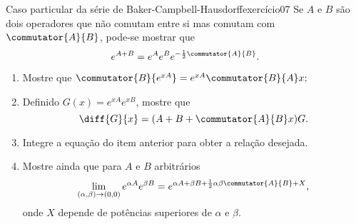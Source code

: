\begin{exercício}{Caso particular da série de Baker-Campbell-Hausdorff}{exercício07}
    Se \(A\) e \(B\) são dois operadores que não comutam entre si mas comutam com \(\commutator{A}{B}\), pode-se mostrar que 
    \begin{equation*}
        e^{A + B} = e^A e^B e^{-\frac12 \commutator{A}{B}}.
    \end{equation*}
    \begin{enumerate}[label=(\alph*)]
        \item Mostre que \(\commutator{B}{e^{xA}} = e^{xA} \commutator{B}{A}x;\)
        \item Definido \(G(x) = e^{xA}e^{xB}\), mostre que
            \begin{equation*}
                \diff{G}{x} = (A + B + \commutator{A}{B}x)G.
            \end{equation*}
        \item Integre a equação do item anterior para obter a relação desejada.
        \item Mostre ainda que para \(A\) e \(B\) arbitrários
            \begin{equation*}
                \lim_{(\alpha, \beta)\to (0,0)} e^{\alpha A} e^{\beta B} = e^{\alpha A + \beta B + \frac12 \alpha \beta \commutator{A}{B} + X},
            \end{equation*}
            onde \(X\) depende de potências superiores de \(\alpha\) e \(\beta\).
    \end{enumerate}
\end{exercício}
